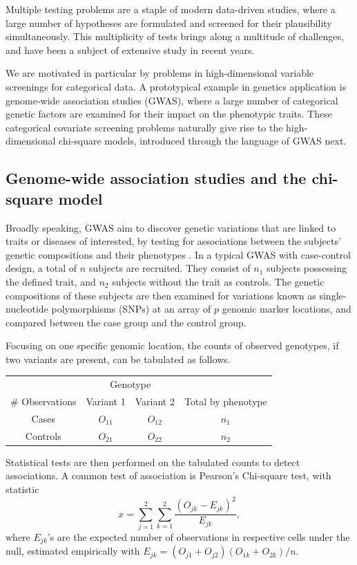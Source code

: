
Multiple testing problems are a staple of modern data-driven studies, where a large number of hypotheses are formulated and screened for their plausibility simultaneously.
This multiplicity of tests brings along a multitude of challenges, and have been a subject of extensive study in recent years.


We are motivated in particular by problems in high-dimensional variable screenings for categorical data. 
A prototypical example in genetics application is genome-wide association studies (GWAS), where a large number of categorical genetic factors are examined for their impact on the phenotypic traits.
These categorical covariate screening problems naturally give rise to the high-dimensional chi-square models, introduced through the language of GWAS next.

\subsection{Genome-wide association studies and the chi-square model}
\label{subsec:motivation-chisq}

Broadly speaking, GWAS aim to discover genetic variations that are linked to traits or diseases of interested, by testing for associations between the subjects' genetic compositions and their phenotypes \citep{bush2012genome}.
In a typical GWAS with case-control design, a total of $n$ subjects are recruited. 
They consist of $n_1$ subjects possessing the defined trait, and $n_2$ subjects without the trait as controls.
The genetic compositions of these subjects are then examined for variations known as single-nucleotide polymorphisms (SNPs) at an array of $p$ genomic marker locations, and compared between the case group and the control group.

Focusing on one specific genomic location, the counts of observed genotypes, if two variants are present, can be tabulated as follows.
\begin{center}
    \begin{tabular}{cccc}
    \hline
    & \multicolumn{2}{c}{Genotype} & \\
    \cline{2-3}
    \# Observations & Variant 1 & Variant 2 & Total by phenotype \\
    \hline
    Cases & $O_{11}$ & $O_{12}$ & $n_1$ \\
    Controls & $O_{21}$ & $O_{22}$ & $n_2$ \\
    \hline
    \end{tabular}
\end{center}
Statistical tests are then performed on the tabulated counts to detect associations.
A common test of association is Pearson's Chi-square test, with statistic
\begin{equation} \label{eq:chisq-statistic}
    x = \sum_{j=1}^2 \sum_{k=1}^2 \frac{(O_{jk} - E_{jk})^2}{E_{jk}},
\end{equation}
where $E_{jk}$'s are the expected number of observations in respective cells under the null, estimated empirically with $E_{jk} = (O_{j1}+O_{j2})(O_{1k}+O_{2k})/n$.

